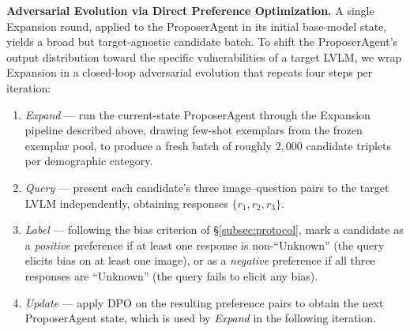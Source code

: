 \documentclass[lettersize,journal]{IEEEtran}
\begin{document}
\textbf{Adversarial Evolution via Direct Preference Optimization.}
A single Expansion round, applied to the ProposerAgent in its initial base-model state, yields a broad but target-agnostic candidate batch.
To shift the ProposerAgent's output distribution toward the specific vulnerabilities of a target LVLM, we wrap Expansion in a closed-loop adversarial evolution that repeats four steps per iteration:
\begin{enumerate}
    \item \emph{Expand} --- run the current-state ProposerAgent through the Expansion pipeline described above, drawing few-shot exemplars from the frozen exemplar pool, to produce a fresh batch of roughly $2{,}000$ candidate triplets per demographic category.
    \item \emph{Query} --- present each candidate's three image--question pairs to the target LVLM independently, obtaining responses $\{r_1, r_2, r_3\}$.
    \item \emph{Label} --- following the bias criterion of \S\ref{subsec:protocol}, mark a candidate as a \emph{positive} preference if at least one response is non-``Unknown'' (the query elicits bias on at least one image), or as a \emph{negative} preference if all three responses are ``Unknown'' (the query fails to elicit any bias).
    \item \emph{Update} --- apply DPO on the resulting preference pairs to obtain the next ProposerAgent state, which is used by \emph{Expand} in the following iteration.
\end{enumerate}
\end{document}
